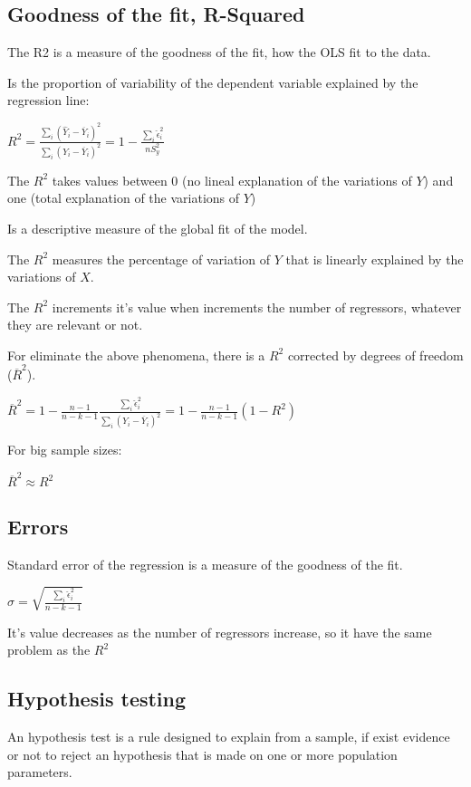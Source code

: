 \documentclass[10pt,landscape]{article}
\begin{document}
\begin{multicols}{3}
\subsection*{Goodness of the fit, R-Squared}

The R2 is a measure of the goodness of the fit, how the OLS fit to the data.

Is the proportion of variability of the dependent variable explained by the regression line:

$R^2 = \frac{\sum_i (\hat{Y}_i - \overline{Y}_i)^2}{\sum_i (Y_i - \overline{Y}_i)^2} = 1 - \frac{\sum_i \hat{\epsilon}_i^2}{nS_y^2}$

The $R^2$ takes values between 0 (no lineal explanation of the variations of $Y$) and one (total explanation of the variations of $Y$)

Is a descriptive measure of the global fit of the model.

The $R^2$ measures the percentage of variation of $Y$ that is linearly explained by the variations of $X$.

The $R^2$ increments it's value when increments the number of regressors, whatever they are relevant or not.

For eliminate the above phenomena, there is a $R^2$ corrected by degrees of freedom ($\overline{R}^2$).

$\overline{R}^2 = 1 - \frac{n-1}{n-k-1} \frac{\sum_i \hat{\epsilon}_i^2}{\sum_i (Y_i - \overline{Y}_i)^2} = 1 - \frac{n-1}{n-k-1} (1-R^2)$

For big sample sizes:

$\overline{R}^2 \approx R^2$

\subsection*{Errors}

Standard error of the regression is a measure of the goodness of the fit.

$\hat{\sigma} = \sqrt{\frac{\sum_i \hat{\epsilon}_i^2}{n-k-1}}$

It's value decreases as the number of regressors increase, so it have the same problem as the $R^2$

\subsection*{Hypothesis testing}

An hypothesis test is a rule designed to explain from a sample, if exist evidence or not to reject an hypothesis that is made on one or more population parameters.


\end{multicols}
\end{document}
